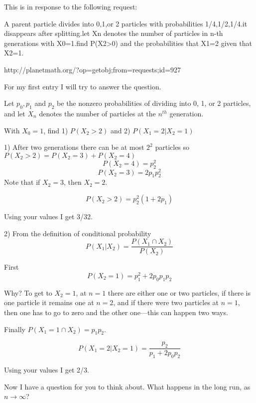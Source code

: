 \documentclass[12pt]{article}
\begin{document}
This is in response to the following request:

A parent particle divides into 0,1,or 2 particles with probabilities 1/4,1/2,1/4.it disappears after splitting.let Xn denotes the number of particles in n-th generations with X0=1.find P(X2>0) and the probabilities that X1=2 given that X2=1. 

http://planetmath.org/?op=getobj;from=requests;id=927

For my first entry I will try to answer the question.

Let $p_0, p_1$ and $p_2$ be the nonzero probabilities of dividing into 0, 1, or 2 particles, and let $X_n$ denotes the number of particles at the $n^{th}$ generation.

With $X_0 =1$, find 1) $P(X_2 > 2)$ and 2) $P(X_1 = 2 | X_2 = 1)$

1) After two generations there can be at most $2^2$ particles so $P(X_2 >2) = P(X_2 = 3) + P(X_2 =4)$
$$P(X_2 = 4) = p_2^2$$
$$P(X_2 = 3) = 2 p_1 p_2^2$$
Note that if $X_2 = 3$, then $X_2 = 2$.

$$P(X_2 > 2) = p_2^2(1 + 2 p_1)$$

Using your values I get 3/32.

2) From the definition of conditional probability 
$$P(X_1|X_2) = \frac{P(X_1 \cap X_2)}{P(X_2)}$$ 

First 
$$P(X_2 = 1) = p_1^2  +  2 p_0 p_1 p_2$$

Why?
To get to $X_2 = 1$, at $n=1$ there are either one or two particles, if there is one particle it remains one at $n=2$, and if there were two particles at $n=1$, then one has to go to zero and the other one---this can happen two ways.

Finally $P(X_1 =1 \cap X_2) = p_1 p_2$.

$$P(X_1 = 2 | X_2 = 1) = \frac{p_2}{p_1 + 2 p_0 p_2}$$

Using your values I get 2/3.

Now I have a question for you to think about. What happens in the long run, as $n \rightarrow \infty$?
\end{document}
